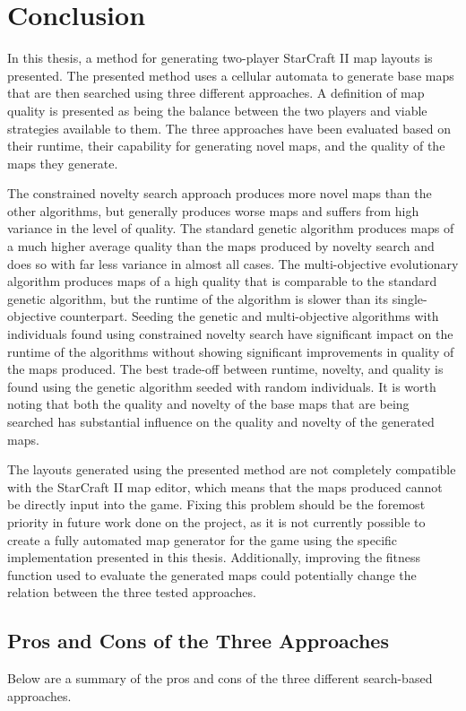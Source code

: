 \chapter{Conclusion}
\label{conclusion}
In this thesis, a method for generating two-player StarCraft II map layouts is presented. The presented method uses a cellular automata to generate base maps that are then searched using three different approaches. A definition of map quality is presented as being the balance between the two players and viable strategies available to them. The three approaches have been evaluated based on their runtime, their capability for generating novel maps, and the quality of the maps they generate.

The constrained novelty search approach produces more novel maps than the other algorithms, but generally produces worse maps and suffers from high variance in the level of quality. The standard genetic algorithm produces maps of a much higher average quality than the maps produced by novelty search and does so with far less variance in almost all cases. The multi-objective evolutionary algorithm produces maps of a high quality that is comparable to the standard genetic algorithm, but the runtime of the algorithm is slower than its single-objective counterpart. Seeding the genetic and multi-objective algorithms with individuals found using constrained novelty search have significant impact on the runtime of the algorithms without showing significant improvements in quality of the maps produced. The best trade-off between runtime, novelty, and quality is found using the genetic algorithm seeded with random individuals. It is worth noting that both the quality and novelty of the base maps that are being searched has substantial influence on the quality and novelty of the generated maps.

The layouts generated using the presented method are not completely compatible with the StarCraft II map editor, which means that the maps produced cannot be directly input into the game. Fixing this problem should be the foremost priority in future work done on the project, as it is not currently possible to create a fully automated map generator for the game using the specific implementation presented in this thesis. Additionally, improving the fitness function used to evaluate the generated maps could potentially change the relation between the three tested approaches.

\section{Pros and Cons of the Three Approaches}
Below are a summary of the pros and cons of the three different search-based approaches.
